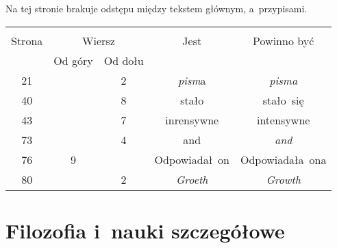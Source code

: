 \documentclass[a4paper,11pt]{article}
\begin{document}


\start {} Na tej stronie brakuje odstępu między tekstem głównym,
a~przypisami.

\vspace{\spaceFour}







\begin{center}

  \begin{tabular}{|c|c|c|c|c|}
    \hline
    & \multicolumn{2}{c|}{} & & \\
    Strona & \multicolumn{2}{c|}{Wiersz} & Jest
                              & Powinno być \\ \cline{2-3}
    & Od góry & Od dołu & & \\
    \hline
    21  & &  2 & \textit{pism}a & \textit{pisma} \\
    40  & &  8 & stało & stało~się \\
    43  & &  7 & inrensywne & intensywne \\
    73  & &  4 & and & \textit{and} \\
    76  &  9 & & Odpowiadał~on & Odpowiadała~ona \\
    80  & &  2 & \textit{Groeth} & \textit{Growth} \\
    \hline
  \end{tabular}

\end{center}


\vspace{\spaceTwo}










\newpage
\section{Filozofia i~nauki szczegółowe}
\end{document}
